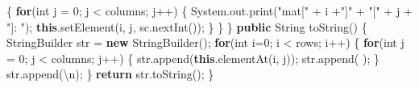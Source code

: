 \documentclass[
  12pt,
]{article}
\newenvironment{Shaded}{}{}
\newcommand{\BuiltInTok}[1]{\textcolor[rgb]{0.00,0.50,0.00}{#1}}
\newcommand{\CharTok}[1]{\textcolor[rgb]{0.25,0.44,0.63}{#1}}
\newcommand{\ControlFlowTok}[1]{\textcolor[rgb]{0.00,0.44,0.13}{\textbf{#1}}}
\newcommand{\DataTypeTok}[1]{\textcolor[rgb]{0.56,0.13,0.00}{#1}}
\newcommand{\DecValTok}[1]{\textcolor[rgb]{0.25,0.63,0.44}{#1}}
\newcommand{\FunctionTok}[1]{\textcolor[rgb]{0.02,0.16,0.49}{#1}}
\newcommand{\KeywordTok}[1]{\textcolor[rgb]{0.00,0.44,0.13}{\textbf{#1}}}
\newcommand{\NormalTok}[1]{#1}
\newcommand{\OperatorTok}[1]{\textcolor[rgb]{0.40,0.40,0.40}{#1}}
\newcommand{\StringTok}[1]{\textcolor[rgb]{0.25,0.44,0.63}{#1}}
\begin{document}
\begin{Shaded}
\begin{Highlighting}[numbers=left,,]
        \OperatorTok{\{}
            \ControlFlowTok{for}\OperatorTok{(}\DataTypeTok{int}\NormalTok{ j }\OperatorTok{=} \DecValTok{0}\OperatorTok{;}\NormalTok{ j }\OperatorTok{\textless{}}\NormalTok{ columns}\OperatorTok{;}\NormalTok{ j}\OperatorTok{++)}
            \OperatorTok{\{}
                \BuiltInTok{System}\OperatorTok{.}\FunctionTok{out}\OperatorTok{.}\FunctionTok{print}\OperatorTok{(}\StringTok{"mat["} \OperatorTok{+}\NormalTok{ i }\OperatorTok{+}\StringTok{"]"} \OperatorTok{+} \StringTok{"["} \OperatorTok{+}\NormalTok{ j }\OperatorTok{+} \StringTok{"]: "}\OperatorTok{);}
                \KeywordTok{this}\OperatorTok{.}\FunctionTok{setElement}\OperatorTok{(}\NormalTok{i}\OperatorTok{,}\NormalTok{ j}\OperatorTok{,}\NormalTok{ sc}\OperatorTok{.}\FunctionTok{nextInt}\OperatorTok{());}
            \OperatorTok{\}}
        \OperatorTok{\}}
    \OperatorTok{\}}
    \KeywordTok{public} \BuiltInTok{String} \FunctionTok{toString}\OperatorTok{()}
    \OperatorTok{\{}
        \BuiltInTok{StringBuilder}\NormalTok{ str }\OperatorTok{=} \KeywordTok{new} \BuiltInTok{StringBuilder}\OperatorTok{();}
        \ControlFlowTok{for}\OperatorTok{(}\DataTypeTok{int}\NormalTok{ i}\OperatorTok{=}\DecValTok{0}\OperatorTok{;}\NormalTok{ i }\OperatorTok{\textless{}}\NormalTok{ rows}\OperatorTok{;}\NormalTok{ i}\OperatorTok{++)}
        \OperatorTok{\{}
            \ControlFlowTok{for}\OperatorTok{(}\DataTypeTok{int}\NormalTok{ j }\OperatorTok{=} \DecValTok{0}\OperatorTok{;}\NormalTok{ j }\OperatorTok{\textless{}}\NormalTok{ columns}\OperatorTok{;}\NormalTok{ j}\OperatorTok{++)}
            \OperatorTok{\{}
\NormalTok{                str}\OperatorTok{.}\FunctionTok{append}\OperatorTok{(}\KeywordTok{this}\OperatorTok{.}\FunctionTok{elementAt}\OperatorTok{(}\NormalTok{i}\OperatorTok{,}\NormalTok{ j}\OperatorTok{));}
\NormalTok{                str}\OperatorTok{.}\FunctionTok{append}\OperatorTok{(}\CharTok{\textquotesingle{} \textquotesingle{}}\OperatorTok{);}
            \OperatorTok{\}}
\NormalTok{            str}\OperatorTok{.}\FunctionTok{append}\OperatorTok{(}\CharTok{\textquotesingle{}\textbackslash{}n\textquotesingle{}}\OperatorTok{);}
        \OperatorTok{\}}
        \ControlFlowTok{return}\NormalTok{ str}\OperatorTok{.}\FunctionTok{toString}\OperatorTok{();}
    \OperatorTok{\}}


\end{Highlighting}
\end{Shaded}
\end{document}
